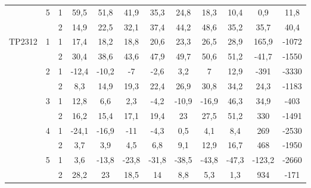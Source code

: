 \begin{table}[H]
\begin{adjustwidth}{-1em}{}
\begin{tabular}{|c|c|c|c|c|c|c|c|c|c|c|c|}
  \cline{2-12}          & \multirow{2}[4]{*}{5} & 1     & 59,5  & 51,8  & 41,9  & 35,3  & 24,8  & 18,3  & 10,4  & 0,9   & 11,8 \bigstrut\\
  \cline{3-12}          &       & 2     & 14,9  & 22,5  & 32,1  & 37,4  & 44,2  & 48,6  & 35,2  & 35,7  & 40,4 \bigstrut\\
      \hline
      \multicolumn{1}{|c|}{\multirow{10}[20]{*}{TP2312}} & \multirow{2}[4]{*}{1} & 1     & 17,4  & 18,2  & 18,8  & 20,6  & 23,3  & 26,5  & 28,9  & 165,9 & -1072 \bigstrut\\
  \cline{3-12}          &       & 2     & 30,4  & 38,6  & 43,6  & 47,9  & 49,7  & 50,6  & 51,2  & -41,7 & -1550 \bigstrut\\
  \cline{2-12}          & \multirow{2}[4]{*}{2} & 1     & -12,4 & -10,2 & -7    & -2,6  & 3,2   & 7     & 12,9  & -391  & -3330 \bigstrut\\
  \cline{3-12}          &       & 2     & 8,3   & 14,9  & 19,3  & 22,4  & 26,9  & 30,8  & 34,2  & 24,3  & -1183 \bigstrut\\
  \cline{2-12}          & \multirow{2}[4]{*}{3} & 1     & 12,8  & 6,6   & 2,3   & -4,2  & -10,9 & -16,9 & 46,3  & 34,9  & -403 \bigstrut\\
  \cline{3-12}          &       & 2     & 16,2  & 15,4  & 17,1  & 19,4  & 23    & 27,5  & 51,2  & 330   & -1491 \bigstrut\\
  \cline{2-12}          & \multirow{2}[4]{*}{4} & 1     & -24,1 & -16,9 & -11   & -4,3  & 0,5   & 4,1   & 8,4   & 269   & -2530 \bigstrut\\
  \cline{3-12}          &       & 2     & 3,7   & 3,9   & 4,5   & 6,8   & 9,1   & 12,9  & 16,7  & 468   & -1950 \bigstrut\\
  \cline{2-12}          & \multirow{2}[4]{*}{5} & 1     & 3,6   & -13,8 & -23,8 & -31,8 & -38,5 & -43,8 & -47,3 & -123,2 & -2660 \bigstrut\\
  \cline{3-12}          &       & 2     & 28,2  & 23    & 18,5  & 14    & 8,8   & 5,3   & 1,3   & 934   & -171 \bigstrut\\
      \hline
      \end{tabular}%
    \label{tab:Vcm1}%
    \end{adjustwidth}
  \end{table}



